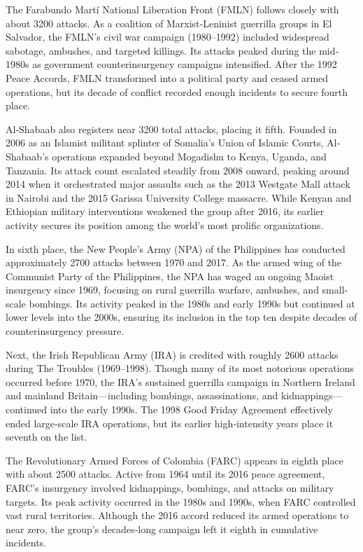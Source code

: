 The Farabundo Martí National Liberation Front (FMLN) follows closely with about 3200 attacks. As a coalition of Marxist‐Leninist guerrilla groups in El Salvador, the FMLN’s civil war campaign (1980–1992) included widespread sabotage, ambushes, and targeted killings. Its attacks peaked during the mid‐1980s as government counterinsurgency campaigns intensified. After the 1992 Peace Accords, FMLN transformed into a political party and ceased armed operations, but its decade of conflict recorded enough incidents to secure fourth place.  

Al‐Shabaab also registers near 3200 total attacks, placing it fifth. Founded in 2006 as an Islamist militant splinter of Somalia’s Union of Islamic Courts, Al‐Shabaab’s operations expanded beyond Mogadishu to Kenya, Uganda, and Tanzania. Its attack count escalated steadily from 2008 onward, peaking around 2014 when it orchestrated major assaults such as the 2013 Westgate Mall attack in Nairobi and the 2015 Garissa University College massacre. While Kenyan and Ethiopian military interventions weakened the group after 2016, its earlier activity secures its position among the world’s most prolific organizations.  

In sixth place, the New People’s Army (NPA) of the Philippines has conducted approximately 2700 attacks between 1970 and 2017. As the armed wing of the Communist Party of the Philippines, the NPA has waged an ongoing Maoist insurgency since 1969, focusing on rural guerrilla warfare, ambushes, and small‐scale bombings. Its activity peaked in the 1980s and early 1990s but continued at lower levels into the 2000s, ensuring its inclusion in the top ten despite decades of counterinsurgency pressure.  

Next, the Irish Republican Army (IRA) is credited with roughly 2600 attacks during The Troubles (1969–1998). Though many of its most notorious operations occurred before 1970, the IRA’s sustained guerrilla campaign in Northern Ireland and mainland Britain—including bombings, assassinations, and kidnappings—continued into the early 1990s. The 1998 Good Friday Agreement effectively ended large‐scale IRA operations, but its earlier high‐intensity years place it seventh on the list.  

The Revolutionary Armed Forces of Colombia (FARC) appears in eighth place with about 2500 attacks. Active from 1964 until its 2016 peace agreement, FARC’s insurgency involved kidnappings, bombings, and attacks on military targets. Its peak activity occurred in the 1980s and 1990s, when FARC controlled vast rural territories. Although the 2016 accord reduced its armed operations to near zero, the group’s decades‐long campaign left it eighth in cumulative incidents.  

